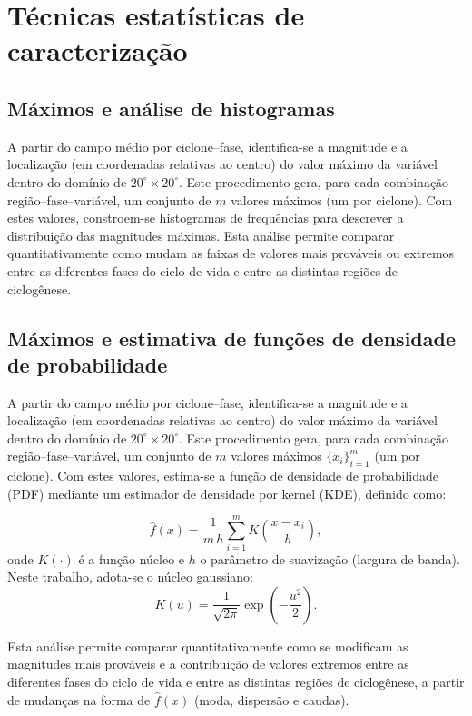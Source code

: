\section{Técnicas estatísticas de caracterização}\label{sec:tecnicas_estadisticas}

\subsection{Máximos e análise de histogramas}\label{subsec:extraccion_histogramas}
A partir do campo médio por ciclone--fase, identifica-se a magnitude e a localização (em coordenadas relativas ao centro) do valor máximo da variável dentro do domínio de $20^{\circ} \times 20^{\circ}$. Este procedimento gera, para cada combinação região--fase--variável, um conjunto de $m$ valores máximos (um por ciclone). Com estes valores, constroem-se histogramas de frequências para descrever a distribuição das magnitudes máximas. Esta análise permite comparar quantitativamente como mudam as faixas de valores mais prováveis ou extremos entre as diferentes fases do ciclo de vida e entre as distintas regiões de ciclogênese.

\subsection{Máximos e estimativa de funções de densidade de probabilidade}\label{subsec:extraccion_pdf}
A partir do campo médio por ciclone--fase, identifica-se a magnitude e a localização (em coordenadas relativas ao centro) do valor máximo da variável dentro do domínio de $20^{\circ}\times 20^{\circ}$. Este procedimento gera, para cada combinação região--fase--variável, um conjunto de $m$ valores máximos $\{x_i\}_{i=1}^{m}$ (um por ciclone). Com estes valores, estima-se a função de densidade de probabilidade (PDF) mediante um estimador de densidade por kernel (KDE), definido como:

\begin{equation}
\hat{f}(x)=\frac{1}{m\,h}\sum_{i=1}^{m}K\!\left(\frac{x-x_i}{h}\right),
\label{eq:kde_pdf}
\end{equation}
onde $K(\cdot)$ é a função núcleo e $h$ o parâmetro de suavização (largura de banda). Neste trabalho, adota-se o núcleo gaussiano:
\begin{equation}
K(u)=\frac{1}{\sqrt{2\pi}}\exp\!\left(-\frac{u^{2}}{2}\right).
\label{eq:gaussian_kernel}
\end{equation}

Esta análise permite comparar quantitativamente como se modificam as magnitudes mais prováveis e a contribuição de valores extremos entre as diferentes fases do ciclo de vida e entre as distintas regiões de ciclogênese, a partir de mudanças na forma de $\hat{f}(x)$ (moda, dispersão e caudas).

